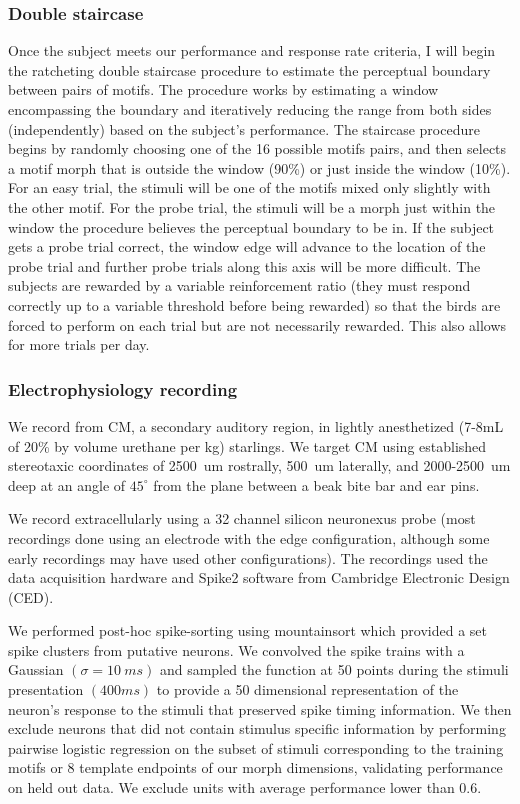 \subsubsection{Double staircase}
Once the subject meets our performance and response rate criteria, I will begin the ratcheting double staircase procedure to estimate the perceptual boundary between pairs of motifs. The procedure works by estimating a window encompassing the boundary and iteratively reducing the range from both sides (independently) based on the subject's performance. The staircase procedure begins by randomly choosing one of the 16 possible motifs pairs, and then selects a motif morph that is outside the window (90\%) or just inside the window (10\%). For an easy trial, the stimuli will be one of the motifs mixed only slightly with the other motif. For the probe trial, the stimuli will be a morph just within the window the procedure believes the perceptual boundary to be in. If the subject gets a probe trial correct, the window edge will advance to the location of the probe trial and further probe trials along this axis will be more difficult. The subjects are rewarded by a variable reinforcement ratio (they must respond correctly up to a variable threshold before being rewarded) so that the birds are forced to perform on each trial but are not necessarily rewarded. This also allows for more trials per day.

\subsubsection{Electrophysiology recording}

We record from \ac{CM}, a secondary auditory region, in lightly anesthetized (7-8mL of 20\% by volume urethane per kg) starlings. We target \ac{CM} using established stereotaxic coordinates of \SI{2500}{um} rostrally, \SI{500}{um} laterally, and 2000-\SI{2500}{um} deep at an angle of $45^\circ$ from the plane between a beak bite bar and ear pins. 

We record extracellularly using a 32 channel silicon neuronexus probe (most recordings done using an electrode with the edge configuration, although some early recordings may have used other configurations). The recordings used the data acquisition hardware and Spike2 software from Cambridge Electronic Design (CED).

We performed post-hoc spike-sorting using mountainsort\cite{mountainsort} which provided a set spike clusters from putative neurons. We convolved the spike trains with a Gaussian $(\sigma=\SI{10}{ms})$ and sampled the function at 50 points during the stimuli presentation $(400 ms)$ to provide a 50 dimensional representation of the neuron's response to the stimuli that preserved spike timing information. We then exclude neurons that did not contain stimulus specific information by performing pairwise logistic regression on the subset of stimuli corresponding to the training motifs or 8 template endpoints of our morph dimensions, validating performance on held out data. We exclude units with average performance lower than 0.6.

